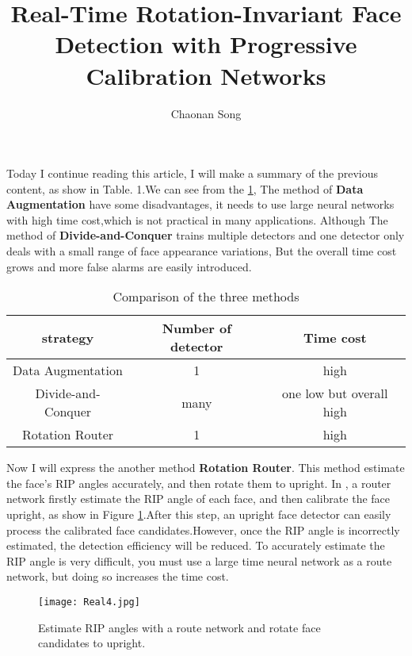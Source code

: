 \documentclass{article}
\title{Real-Time Rotation-Invariant Face Detection with Progressive Calibration Networks}
\author{Chaonan Song}
\begin{document}

\maketitle
\par Today I continue reading this article, I will make a summary of the previous content, as show in Table. 1.We can see from the \ref{Table1}, The method of \textbf{Data Augmentation} have some disadvantages, it needs to use large neural networks with high time cost,which is not practical in many applications. Although The method of  \textbf{Divide-and-Conquer} trains multiple detectors and one detector only deals with a small range of face appearance variations, But the overall time cost grows and more false alarms are easily introduced.
\begin{table}[H]
  \centering
   \begin{tabular}{|c|c|c|}
     \hline
     strategy & Number of detector & Time cost  \\ \hline
     Data Augmentation & 1 &  high \\ \hline
     Divide-and-Conquer & many &one low but overall high  \\ \hline
     Rotation Router & 1 & high  \\ \hline
   \end{tabular}
  \caption{Comparison of the three methods}\label{Table1}
\end{table}
\par Now I will express the another method \textbf{Rotation Router}. This method estimate the face's RIP angles accurately, and then rotate them to upright. In \cite{[18]}, a router network firstly estimate the RIP angle of each face, and then calibrate the face upright, as show in Figure \ref{fig:1}.After this step, an upright face detector can easily process the calibrated face candidates.However, once the RIP angle is incorrectly estimated, the detection efficiency will be reduced. To accurately estimate the RIP angle is very difficult, you must use a large time neural network as a route network, but doing so increases the time cost.
\begin{figure}[H]
            \centering
            \texttt{[image: Real4.jpg]}
            \caption{Estimate RIP angles with a route network and rotate face candidates to upright\cite{[18]}.}
            \label{fig:1}
\end{figure}
\end{document}
